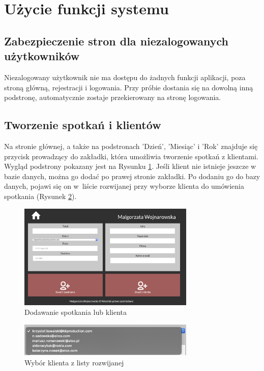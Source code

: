 \documentclass[eng,printmode,openany,oneside]{mgr}
\begin{document}
\section{Użycie funkcji systemu}

\subsection{Zabezpieczenie stron dla niezalogowanych użytkowników}

Niezalogowany użytkownik nie ma dostępu do żadnych funkcji aplikacji, poza stroną główną, rejestracji i logowania. Przy próbie dostania się na dowolną inną podstronę, automatycznie zostaje przekierowany na stronę logowania.



\subsection{Tworzenie spotkań i klientów}

Na stronie głównej, a także na podstronach 'Dzień', 'Miesiąc' i 'Rok' znajduje się przycisk prowadzący do zakładki, która umożliwia tworzenie spotkań z klientami. Wygląd podstrony pokazany jest na Rysunku \ref{fig:15}. Jeśli klient nie istnieje jeszcze w bazie danych, można go dodać po prawej stronie zakładki. Po dodaniu go do bazy danych, pojawi się on w~liście rozwijanej przy wyborze klienta do umówienia spotkania (Rysunek \ref{fig:16}).

	\begin{figure}[H]
		\centering
		\includegraphics[width=0.75\textwidth]{dodaj_spotkanie}
		\caption{Dodawanie spotkania lub klienta}
		\label{fig:15}
	\end{figure}
	
	\begin{figure}[H]
		\centering
		\includegraphics[width=0.75\textwidth]{wybor_klienta}
		\caption{Wybór klienta z listy rozwijanej}
		\label{fig:16}
	\end{figure}
\end{document}
